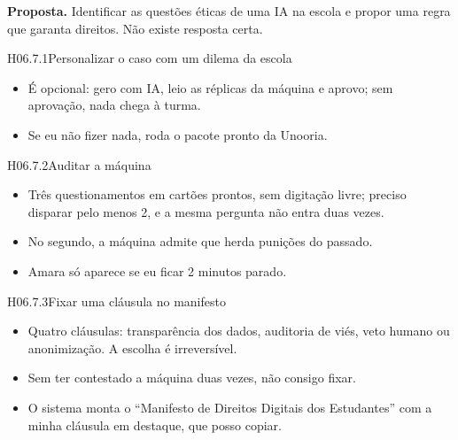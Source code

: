 \textbf{Proposta.} Identificar as questões éticas de uma IA na escola e propor
uma regra que garanta direitos. Não existe resposta certa.

\begin{historia}{H06.7.1}{Personalizar o caso com um dilema da escola}{\pronto}
\aceite
\begin{itemize}
  \item É opcional: gero com IA, leio as réplicas da máquina e aprovo; sem
    aprovação, nada chega à turma.
  \item Se eu não fizer nada, roda o pacote pronto da Unooria.
\end{itemize}
\end{historia}

\begin{historia}{H06.7.2}{Auditar a máquina}{\pronto}
\aceite
\begin{itemize}
  \item Três questionamentos em cartões prontos, sem digitação livre; preciso
    disparar pelo menos 2, e a mesma pergunta não entra duas vezes.
  \item No segundo, a máquina admite que herda punições do passado.
  \item Amara só aparece se eu ficar 2 minutos parado.
\end{itemize}
\end{historia}

\begin{historia}{H06.7.3}{Fixar uma cláusula no manifesto}{\pronto}
\aceite
\begin{itemize}
  \item Quatro cláusulas: transparência dos dados, auditoria de viés, veto
    humano ou anonimização. A escolha é irreversível.
  \item Sem ter contestado a máquina duas vezes, não consigo fixar.
  \item O sistema monta o \enquote{Manifesto de Direitos Digitais dos
    Estudantes} com a minha cláusula em destaque, que posso copiar.
\end{itemize}
\end{historia}

